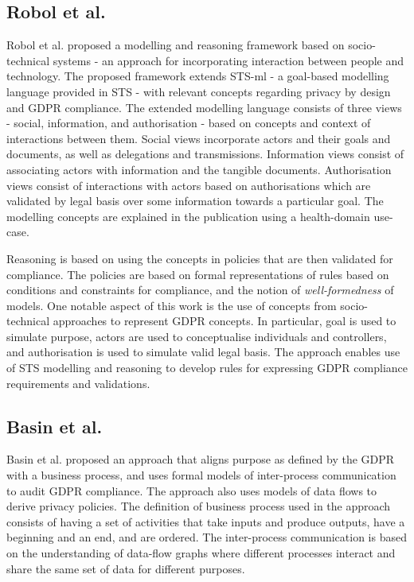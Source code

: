 \subsection*{Robol et al.}
Robol et al. \cite{robol_toward_2017} proposed a modelling and reasoning framework based on socio-technical systems \cite{dalpiaz_security_2016} - an approach for incorporating interaction between people and technology. The proposed framework extends STS-ml - a goal-based modelling language provided in STS - with relevant concepts regarding privacy by design and GDPR compliance. The extended modelling language consists of three views - social, information, and authorisation - based on concepts and context of interactions between them. Social views incorporate actors and their goals and documents, as well as delegations and transmissions. Information views consist of associating actors with information and the tangible documents. Authorisation views consist of interactions with actors based on authorisations which are validated by legal basis over some information towards a particular goal. The modelling concepts are explained in the publication using a health-domain use-case.

Reasoning is based on using the concepts in policies that are then validated for compliance. The policies are based on formal representations of rules based on conditions and constraints for compliance, and the notion of \textit{well-formedness} of models. One notable aspect of this work is the use of concepts from socio-technical approaches to represent GDPR concepts. In particular, goal is used to simulate purpose, actors are used to conceptualise individuals and controllers, and authorisation is used to simulate valid legal basis. The approach enables use of STS modelling and reasoning to develop rules for expressing GDPR compliance requirements and validations.

\subsection*{Basin et al.}
Basin et al. \cite{basin_purpose_2018} proposed an approach that aligns purpose as defined by the GDPR with a business process, and uses formal models of inter-process communication to audit GDPR compliance. The approach also uses models of data flows to derive privacy policies. 
The definition of business process used in the approach consists of having a set of activities that take inputs and produce outputs, have a beginning and an end, and are ordered. The inter-process communication is based on the understanding of data-flow graphs where different processes interact and share the same set of data for different purposes.

